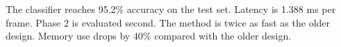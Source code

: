 The classifier reaches 95.2\% accuracy on the test set. Latency is 1.388 ms per frame.
Phase 2 is evaluated second. The method is twice as fast as the older design.
Memory use drops by 40\% compared with the older design.
